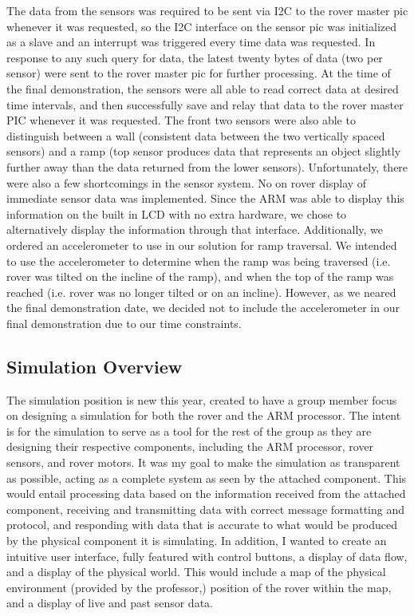 The data from the sensors was required to be sent via I2C to the rover master pic whenever it was requested, so the I2C interface on the sensor pic was initialized as a slave and an interrupt was triggered every time data was requested.  In response to any such query for data, the latest twenty bytes of data (two per sensor) were sent to the rover master pic for further processing.  
At the time of the final demonstration, the sensors were all able to read correct data at desired time intervals, and then successfully save and relay that data to the rover master PIC whenever it was requested.  The front two sensors were also able to distinguish between a wall (consistent data between the two vertically spaced sensors) and a ramp (top sensor produces data that represents an object slightly further away than the data returned from the lower sensors).
Unfortunately, there were also a few shortcomings in the sensor system.  No on rover display of immediate sensor data was implemented.  Since the ARM was able to display this information on the built in LCD with no extra hardware, we chose to alternatively display the information through that interface.  Additionally, we ordered an accelerometer to use in our solution for ramp traversal.  We intended to use the accelerometer to determine when the ramp was being traversed (i.e. rover was tilted on the incline of the ramp), and when the top of the ramp was reached (i.e. rover was no longer tilted or on an incline).  However, as we neared the final demonstration date, we decided not to include the accelerometer in our final demonstration due to our time constraints. 

\subsection{Simulation Overview}
The simulation position is new this year, created to have a group member focus on designing a simulation for both the rover and the ARM processor. The intent is for the simulation to serve as a tool for the rest of the group as they are designing their respective components, including the ARM processor, rover sensors, and rover motors.
It was my goal to make the simulation as transparent as possible, acting as a complete system as seen by the attached component. This would entail processing data based on the information received from the attached component, receiving and transmitting data with correct message formatting and protocol, and responding with data that is accurate to what would be produced by the physical component it is simulating. In addition, I wanted to create an intuitive user interface, fully featured with control buttons, a display of data flow, and a display of the physical world. This would include a map of the physical environment (provided by the professor,) position of the rover within the map, and a display of live and past sensor data.

